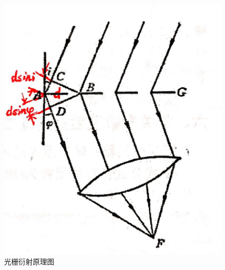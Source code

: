 \documentclass[UTF8]{ctexart}
\begin{document}
\begin{figure}[H]\begin{center}
    \includegraphics[scale=0.16]{4.jpg}
    \caption{光栅衍射原理图}
\end{center}\end{figure}
\end{document}
